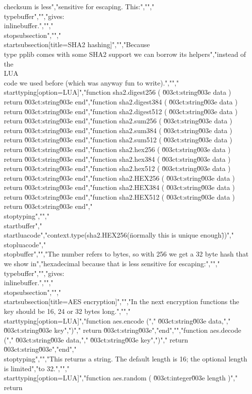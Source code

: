 checksum is less","sensitive for escaping. This:","","\\typebuffer","","gives: \\inlinebuffer.","","\\stopsubsection","","\\startsubsection[title=SHA2 hashing]","","Because \\type {pplib} comes with some SHA2 support we can borrow its helpers","instead of the \\LUA\\ code we used before (which was anyway fun to write).","","\\starttyping[option=LUA]","function sha2.digest256 ( \u003ct:string\u003e data ) return \u003ct:string\u003e end","function sha2.digest384 ( \u003ct:string\u003e data ) return \u003ct:string\u003e end","function sha2.digest512 ( \u003ct:string\u003e data ) return \u003ct:string\u003e end","function sha2.sum256    ( \u003ct:string\u003e data ) return \u003ct:string\u003e end","function sha2.sum384    ( \u003ct:string\u003e data ) return \u003ct:string\u003e end","function sha2.sum512    ( \u003ct:string\u003e data ) return \u003ct:string\u003e end","function sha2.hex256    ( \u003ct:string\u003e data ) return \u003ct:string\u003e end","function sha2.hex384    ( \u003ct:string\u003e data ) return \u003ct:string\u003e end","function sha2.hex512    ( \u003ct:string\u003e data ) return \u003ct:string\u003e end","function sha2.HEX256    ( \u003ct:string\u003e data ) return \u003ct:string\u003e end","function sha2.HEX384    ( \u003ct:string\u003e data ) return \u003ct:string\u003e end","function sha2.HEX512    ( \u003ct:string\u003e data ) return \u003ct:string\u003e end","\\stoptyping","","\\startbuffer","\\startluacode","context.type(sha2.HEX256(\"normally this is unique enough\"))","\\stopluacode","\\stopbuffer","","The number refers to bytes, so with 256 we get a 32 byte hash that we show in","hexadecimal because that is less sensitive for escaping:","","\\typebuffer","","gives: \\inlinebuffer.","","\\stopsubsection","","\\startsubsection[title=AES encryption]","","In the next encryption functions the key should be 16, 24 or 32 bytes long.","","\\starttyping[option=LUA]","function aes.encode (","    \u003ct:string\u003e data,","    \u003ct:string\u003e key",")","    return \u003ct:string\u003e","end","","function aes.decode (","    \u003ct:string\u003e data,","    \u003ct:string\u003e key",")","    return \u003ct:string\u003e","end","\\stoptyping","","This returns a string. The default length is 16; the optional length is limited","to 32.","","\\starttyping[option=LUA]","function aes.random ( \u003ct:integer\u003e length )","    return 